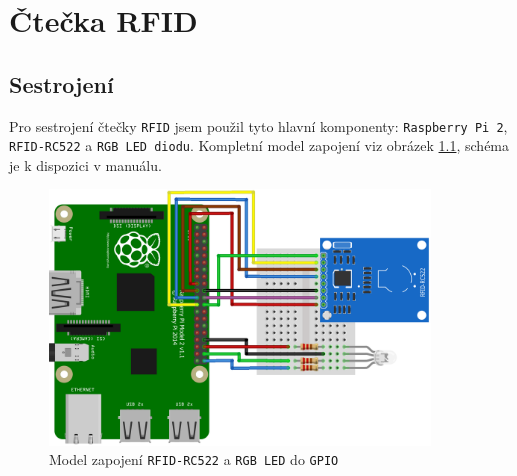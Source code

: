\documentclass[czech,BP]{thesiskiv}
\begin{document}
	
	
	
	
	
	
	
	
	
	
	
	
	

	
	
\chapter{Čtečka RFID}
	\section{Sestrojení}
	
		Pro sestrojení čtečky \texttt{RFID} jsem použil tyto hlavní komponenty: \texttt{Raspberry Pi 2}, \texttt{RFID-RC522} a \texttt{RGB LED diodu}. 
		Kompletní model zapojení viz obrázek \ref{fig:reader_rfid_diagram}, schéma je k dispozici v manuálu.
		
\begin{figure}[H]
		\centering
		\includegraphics[width=0.9\textwidth]{../diagrams/reader_rfid_diagram_bb.png}	
		\caption{Model zapojení \texttt{RFID-RC522} a \texttt{RGB LED} do \texttt{GPIO}}
		\label{fig:reader_rfid_diagram}
	\end{figure}		
		
\newpage
\end{document}

